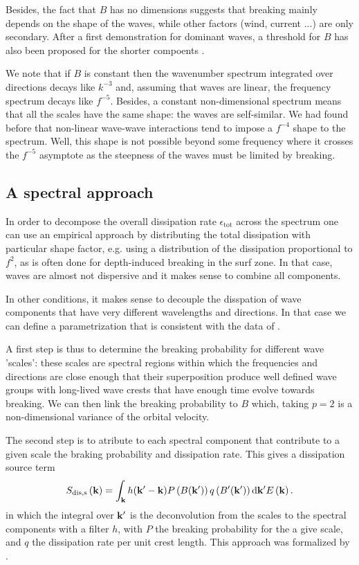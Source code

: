 Besides, the fact that 
$B$ has no dimensions suggests that breaking mainly depends on the shape of the waves, while other factors (wind, current ...) are 
only secondary.   After a first demonstration for dominant waves, a threshold for $B$ has also been proposed for the shorter 
compoents \citep{Banner&al.2002}.

We note that if $B$ is constant then the wavenumber spectrum integrated over directions decays like $k^{-3}$ and, 
assuming that waves are linear, the frequency spectrum decays like $f^{-5}$. Besides, a constant non-dimensional spectrum 
means that all the scales have the same shape: the waves are self-similar. We had found before that non-linear wave-wave 
interactions tend to impose a $f^{-4}$ shape to the spectrum. Well, this shape is not possible beyond some frequency 
where it crosses the $f^{-5}$ asymptote as the steepness of the waves must be limited by breaking. 



\subsection{A spectral approach} 
In order to decompose the overall dissipation rate $ \epsilon_{\mathrm{tot}} $ across the 
spectrum one can use an empirical approach by distributing the total dissipation with 
particular shape factor, e.g. using a distribution of the dissipation proportional to  $f^2$, as is often done 
for depth-induced breaking in the surf zone. In that case, waves are almost not dispersive and it makes sense to 
combine all components. 

In other conditions, it makes sense to decouple the disspation of wave components that 
have very different wavelengths and directions. In that case we can define a parametrization 
that is consistent with the data of \cite{Banner&al.2000}. 

A first step is thus to determine the breaking probability for different wave 'scales': these scales are spectral regions
within which the frequencies and directions are close enough that their superposition 
produce well defined wave groups with long-lived wave crests that have enough time evolve towards breaking. 
We can then link the breaking probability to  $B$ which, taking $p=2$ is a non-dimensional variance of the orbital velocity. 

The second step is to atribute to each spectral component that contribute to a given scale 
the braking probability and dissipation rate. This gives a dissipation source term 
\begin{equation}
  S_{\mathrm{dis,s}}\left(\mathbf{k}\right)=
 \int_{\mathbf{k}} h(\mathbf{k^{\prime}}-\mathbf{k}) P \left(B(\mathbf{k^{\prime}})\right)q\left(B'(\mathbf{k^{\prime}})\right) \mathrm{d} \mathbf{k^{\prime}} E\left(\mathbf{k}\right) .\label{Sds_tot_FA}
\end{equation}
in which the integral over  $\mathbf{k}'$ is the deconvolution from the scales to the spectral components with a filter $h$, 
with  $P$  the breaking probability for the a give scale, and  $q$ the dissipation rate per unit crest length. 
This approach was formalized by  \cite{Filipot&al.2010,Filipot&Ardhuin2012}.

